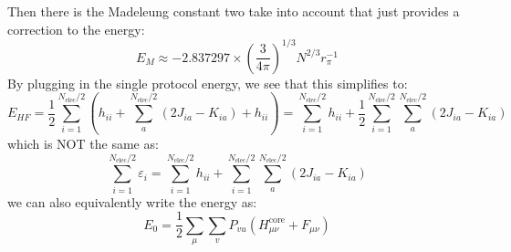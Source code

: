 \documentclass[12pt]{article}
\begin{document}
Then there is the Madeleung constant two take into account that just provides a correction to the energy:
\begin{equation}
E_M \approx-2.837297 \times\left(\frac{3}{4 \pi}\right)^{1 / 3} N^{2 / 3} r_\pi^{-1}
\end{equation}
By plugging in the single protocol energy, we see that this simplifies to:
\begin{equation}
    E_{HF} = \frac{1}{2} \sum_{i=1}^{N_\text{elec}/2} \left(h_{ii} + \sum_{a}^{N_\text{elec}/2} \left(2J_{ia} - K_{ia}\right) + h_{ii}\right) = \sum_{i=1}^{N_\text{elec}/2} h_{ii} + \frac{1}{2} \sum_{i=1}^{N_\text{elec}/2} \sum_{a}^{N_\text{elec}/2} \left(2J_{ia} - K_{ia}\right)
\end{equation}
which is NOT the same as:
\begin{equation}
    \sum_{i=1}^{N_\text{elec}/2} \varepsilon_i = \sum_{i=1}^{N_\text{elec}/2} h_{ii} + \sum_{i=1}^{N_\text{elec}/2} \sum_{a}^{N_\text{elec}/2} \left(2J_{ia} - K_{ia}\right) 
\end{equation}
we can also equivalently write the energy as:
\begin{equation}
    E_0=\frac{1}{2} \sum_\mu \sum_v P_{v u}\left(H_{\mu \nu}^{\mathrm{core}}+F_{\mu \nu}\right)
\end{equation}
\end{document}
